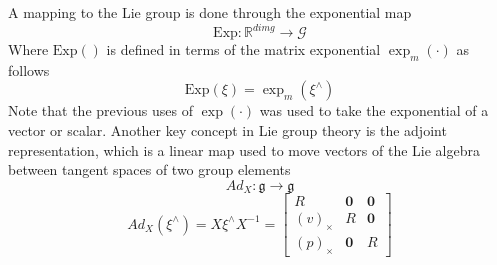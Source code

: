 A mapping to the Lie group is done through the exponential map \cite{Contact-Aided_Invarant_EKF}
\begin{equation}
    \text{Exp} : \mathbb{R}^{dim g} \rightarrow \mathcal{G}
    \label{eq: exp map}
\end{equation}
Where $\text{Exp}()$ is defined in terms of the matrix exponential $ \exp_m{(\cdot)}$ as follows
\begin{equation}
    \text{Exp}(\xi) = \exp_m{(\xi^{\wedge})}
    \label{eq: matrix exp def}
\end{equation}
Note that the previous uses of $\exp{(\cdot)}$ was used to take the exponential of a vector or scalar. Another key concept in Lie group theory is the adjoint representation, which is a linear map used to move vectors of the Lie algebra between tangent spaces of two group elements \cite{Contact-Aided_Invarant_EKF}
\begin{equation}
    Ad_X : \mathfrak{g} \rightarrow \mathfrak{g}
    \label{eq: adj g->g}
\end{equation}
\begin{equation}
    Ad_X(\xi^{\wedge}) = X \xi^{\wedge} X^{-1} = 
    \begin{bmatrix}
        R & \mathbf{0} &\mathbf{0} \\
        (v)_{\times} & R & \mathbf{0}\\
        (p)_{\times} & \mathbf{0} & R
    \end{bmatrix}
    \label{eq: Ad x xi x^T}
\end{equation}

